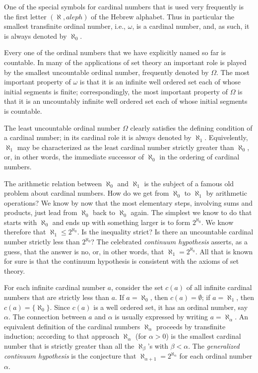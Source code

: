 One of the special symbols for cardinal numbers that is used very frequently is the first letter $(\aleph, aleph)$ of the Hebrew alphabet. Thus in particular the smallest transfinite ordinal number, i.e., $\omega$, is a cardinal number, and, as such, it is always denoted by $\aleph_{0}$.

Every one of the ordinal numbers that we have explicitly named so far is countable. In many of the applications of set theory an important role is played by the smallest uncountable ordinal number, frequently denoted by $\Omega$. The most important property of $\omega$ is that it is an infinite well ordered set each of whose initial segments is finite; correspondingly, the most important property of $\Omega$ is that it is an uncountably infinite well ordered set each of whose initial segments is countable. 

The least uncountable ordinal number $\Omega$ clearly  satisfies the defining condition of a cardinal number; in its cardinal role it is always denoted by $\aleph_{1}$. Equivelently, $\aleph_{1}$ may be characterized as the least cardinal number strictly greater than $\aleph_{0}$, or, in other words, the immediate successor of $\aleph_{0}$ in the ordering of cardinal numbers. 

The arithmetic relation between $\aleph_{0}$ and $\aleph_{1}$ is the subject of a famous old problem about cardinal numbers. How do we get from $\aleph_{0}$ to $\aleph_{1}$ by arithmetic operations? We know by now that the most elementary steps, involving sums and products, just lead from $\aleph_{0}$ back to $\aleph_{0}$ again. The simplest we know to do that starts with $\aleph_{0}$ and ends up with something larger is to form $2^{\aleph_{0}}$. We know therefore that $\aleph_{1} \le 2^{\aleph_{0}}$. Is the inequality strict? Is there an uncountable cardinal number strictly less than $2^{\aleph_{0}}$? The celebrated \textit{continuum hypothesis} asserts, as a guess, that the answer is no, or, in other words, that $\aleph_{1} = 2^{\aleph_{0}}$. All that is known for sure is that the continuum hypothesis is consistent with the axioms of set theory. 

For each infinite cardinal number $a$, consider the set $c(a)$ of all infinite cardinal numbers that are strictly less than $a$. If $a = \aleph_{0}$, then $c(a) = \emptyset$; if $a = \aleph_{1}$, then $c(a) = \{ \aleph_{0} \}$. Since $c(a)$ is a well ordered set, it has an ordinal number, say $\alpha$. The connection between $a$ and $\alpha$ is usually expressed by writing $a = \aleph_{\alpha}$. An equivalent definition of the cardinal numbers $\aleph_{\alpha}$ proceeds by transfinite induction; according to that approach $\aleph_{\alpha}$ (for $\alpha > 0$) is the smallest cardinal number that is strictly greater than all the $\aleph_{\beta}$'s with $\beta < \alpha$. The \textit{generalized continuum hypothesis} is the conjecture that $\aleph_{\alpha + 1} = 2^{\aleph_{\alpha}}$ for each ordinal number $\alpha$.